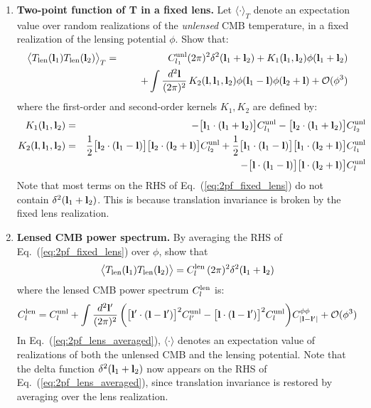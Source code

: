 \documentclass[aps,prd,superscriptaddress,groupedaddress,nofootinbib,nobibnotes]{revtex4}
\newcommand{\be}{\begin{equation}}
\newcommand{\ee}{\end{equation}}
\newcommand{\ba}{\begin{eqnarray}}
\newcommand{\ea}{\end{eqnarray}}
\newcommand{\nn}{\nonumber}
\newcommand{\bigoh}{\mathcal{O}}
\def\l{{\bf l}}
\begin{document}
\begin{enumerate}

\item {\bf Two-point function of T in a fixed lens.}
  Let $\langle \cdot \rangle_T$ denote an expectation value over random realizations
  of the {\em unlensed} CMB temperature, in a fixed realization of the lensing potential $\phi$.
  Show that:
\ba
\big\langle T_{\rm len}(\l_1) T_{\rm len}(\l_2) \big\rangle_T
&=& C_{l_1}^{\rm unl} (2\pi)^2 \delta^2(\l_1+\l_2) + K_1(\l_1,\l_2) \phi(\l_1+\l_2) \nn \\
&& \hspace{0.5cm} + \int \frac{d^2\l}{(2\pi)^2} \, K_2(\l,\l_1,\l_2) \phi(\l_1-\l) \phi(\l_2+\l) + \bigoh(\phi^3) \label{eq:2pf_fixed_lens}
\ea
where the first-order and second-order kernels $K_1,K_2$ are defined by:
\ba
K_1(\l_1,\l_2) &=& -\big[ \l_1\cdot(\l_1+\l_2) \big] C_{l_1}^{\rm unl} - \big[ \l_2\cdot(\l_1+\l_2) \big] C_{l_2}^{\rm unl} \\
K_2(\l,\l_1,\l_2) &=&
\frac{1}{2} \big[ \l_2 \cdot(\l_1-\l) \big] \big[ \l_2 \cdot (\l_2+\l) \big] C_{l_2}^{\rm unl}
+ \frac{1}{2} \big[ \l_1 \cdot(\l_1-\l) \big] \big[ \l_1 \cdot (\l_2+\l) \big] C_{l_1}^{\rm unl} \nn \\
&& \hspace{0.5cm}
- \big[ \l\cdot(\l_1-\l) \big] \big[ \l \cdot (\l_2+\l) \big] C_l^{\rm unl}
\ea
Note that most terms on the RHS of Eq.~(\ref{eq:2pf_fixed_lens}) do not contain $\delta^2(\l_1+\l_2)$.
This is because translation invariance is broken by the fixed lens realization.

\item {\bf Lensed CMB power spectrum.}
By averaging the RHS of Eq.~(\ref{eq:2pf_fixed_lens}) over $\phi$, show that
\be
\big\langle T_{\rm len}(\l_1) T_{\rm len}(\l_2) \big\rangle = C_l^{\rm len} \, (2\pi)^2 \delta^2(\l_1+\l_2)  \label{eq:2pf_lens_averaged}
\ee
where the lensed CMB power spectrum $C_l^{\rm len}$ is:
\be
C_l^{\rm len} = C_l^{\rm unl} + \int \frac{d^2\l'}{(2\pi)^2} \, \bigg(
\big[ \l' \cdot (\l-\l') \big]^2 C_{l'}^{\rm unl} - \big[ \l \cdot (\l-\l') \big]^2 C_l^{\rm unl}
\bigg) C_{|\l-\l'|}^{\phi\phi} + \bigoh(\phi^3)
\ee
In Eq.~(\ref{eq:2pf_lens_averaged}), $\langle \cdot \rangle$ denotes an expectation value
of realizations of both the unlensed CMB and the lensing potential.
Note that the delta function $\delta^2(\l_1+\l_2)$ now appears on the RHS of Eq.~(\ref{eq:2pf_lens_averaged}),
since translation invariance is restored by averaging over the lens realization.


\end{enumerate}
\end{document}
